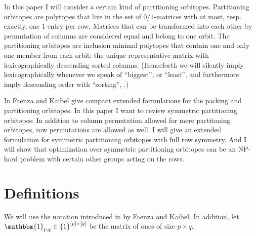 \documentclass[a4paper]{amsart}
\theoremstyle{definition}
\newtheorem{defn}{Definition}
\def\Ie{\emph{I.e.}}
\newcommand\mpar[1]{\marginpar {\flushleft\sffamily\small #1}}
\newcommand{\todo}[1]{\mpar{#1}}
\newcommand{\lrE}[1]{\ensuremath{\left[ #1 \right]}}
\newcommand{\lrM}[1]{\ensuremath{\left\{ #1 \right\}}}
\newcommand{\naturals}{\ensuremath{\mathbb{N}}}
\newcommand{\M}{\ensuremath{\mathcal{M}}}
\begin{document}
In this paper I will consider a certain kind of partitioning
orbitopes.  Partitioning orbitopes are polytopes that live in the set
of \(0/1\)-matrices with at most, resp. exactly, one 1-entry per row.
Matrices that can be transformed into each other by permutation of
columns are considered equal and belong to one orbit.  The
partitioning orbitopes are inclusion minimal polytopes that contain
one and only one member from each orbit: the unique representative
matrix with lexicographically descending sorted columns.  (Henceforth
we will silently imply lexicographically whenever we speak of
``biggest'', or ``least'', and furthermore imply descending order with
``sorting'', .)

In \cite{faenza-2008} Faenza and Kaibel give compact extended
formulations for the packing and partitioning orbitopes.  In this
paper I want to review symmetric partitioning orbitopes: In addition
to column permutation allowed for mere partitoning orbitopes, row
permutations are allowed as well.  I will give an extended formulation
for symmetric partitioning orbitopes with full row symmetry. And I
will show that optimization over symmetric partitioning orbitopes can
be an NP-hard problem \todo{or NP complete?} with certain other groups
acting on the rows.



\section{Definitions}
We will use the notation introduced in \cite{faenza-2008} by Faenza
and Kaibel.  In addition, let \(\mathbbm{1}_{p,q} \in \lrM{1}^{\lrE{p}
  \times \lrE{q}}\) be the matrix of ones of size \(p \times q\).


\end{document}
